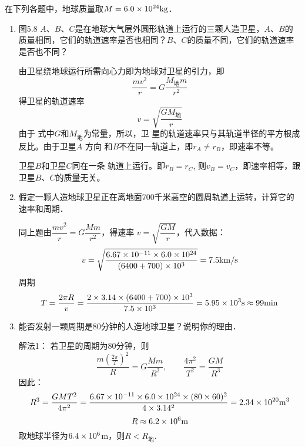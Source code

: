 在下列各题中，地球质量取$M=6.0\times 10^{24}{\rm kg}$．
\begin{enumerate}
	\item 图5.8 $A$、$B$、$C$是在地球大气层外圆形轨道上运行的三颗人造卫星，$A$、$B$的质量相同，它们的轨道速率是否也相同？$B$、$C$的质量不同，它们的轨道速率是否也不同？

\begin{figure}[htp]
\centering{}
\caption{}
\end{figure}


\begin{solution}
	由卫星绕地球运行所需向心力即为地球对卫星的引力，即
\[\frac{mv^2}{r}=G\frac{M_{\text{地}}m}{r^2}\]
得卫星的轨道速率
\[v=\sqrt{\frac{GM_{\text{地}}}{r}}\]
由于
式中$G$和$M_{\text{地}}$为常量，所以，卫
星的轨道速率只与其轨道半径的平方根成反比。由于卫星$A$
方向
和$B$不在同一轨道上，即$r_A\ne r_B$，即速率不等。

卫星$B$和卫星$C$同在一条
轨道上运行。即$r_B=r_C$, 则$v_B=v_C$，即速率相等，跟卫星$B$、$C$的质量无关。
\end{solution}


\item  假定一颗人造地球卫星正在离地面700千米高空的圆周轨道上运转，计算它的速率和周期．

\begin{solution}
	同上题由$\dfrac{mv^2}{r}=G\dfrac{Mm}{r^2}$，得速率
$v=\sqrt{\dfrac{GM}{r}}$，代入数据：
\[v=\sqrt{\frac{6.67\times 10^{-11}\times 6.0\times 10^{24}}{(6400+700)\times 10^3}}=7.5{\rm km/s}\]
周期
\[T=\frac{2\pi R}{v}=\frac{2\times 3.14\times (6400+700)\times 10^3}{7.5\times 10^3}=5.95\times 10^3{\rm s}\approx 99{\rm min}\]
\end{solution}

\item 能否发射一颗周期是80分钟的人造地球卫星？说明你的理由．

\begin{solution}
	解法1：
	若卫星的周期为80分钟，则
\[\frac{m\left(\frac{2\pi}{T}\right)^2}{R}=G\frac{Mm}{R^2},\qquad \frac{4\pi^2}{T^2}=\frac{GM}{R^3}\]
因此：
\[R^3=\frac{GMT^2}{4\pi^2}=\frac{6.67\times 10^{-11}\times 6.0\times 10^{24}\times (80\times 60)^2}{4\times 3.14^2}=2.34\times 10^{20}{\rm m^3}\]
\[R\approx 6.2\times 10^{6}{\rm m}\]
取地球半径为$6.4\times10^6$m，则$R<R_{\text{地}}$.


\end{solution}
\end{enumerate}
